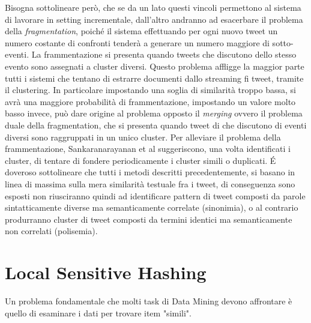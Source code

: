 \documentclass[a4paper,12pt]{report}
\begin{document}
Bisogna sottolineare però, che se da un lato questi vincoli permettono al sistema di lavorare in setting incrementale, dall'altro andranno ad esacerbare il problema della \emph{fragmentation}, poiché il sistema effettuando per ogni nuovo tweet un numero costante di confronti tenderà a generare un numero maggiore di sotto-eventi. La frammentazione si presenta quando tweets che discutono dello stesso evento sono assegnati a cluster diversi. Questo problema affligge la maggior parte tutti i sistemi che tentano di estrarre documenti dallo streaming fi tweet, tramite il clustering. In particolare impostando una soglia di similarità troppo bassa, si avrà una maggiore probabilità di frammentazione, impostando un valore molto basso invece, può dare origine al problema opposto il \emph{merging} ovvero il problema duale della fragmentation, che si presenta quando tweet di che discutono di eventi diversi sono raggruppati in un unico cluster. Per alleviare il problema della frammentazione, Sankaranarayanan et al \cite{Sankaranarayanan:2009:TNT:1653771.1653781} suggeriscono, una volta identificati i cluster, di tentare di fondere periodicamente i cluster simili o duplicati. \'E doveroso sottolineare che tutti i metodi descritti precedentemente, si basano in linea di massima   sulla mera similarità testuale fra i tweet,  di conseguenza sono esposti non riusciranno quindi ad identificare pattern di tweet composti da parole sintatticamente diverse ma  semanticamente correlate (sinonimia), o al contrario produrranno cluster di tweet composti da termini identici ma  semanticamente non correlati (polisemia).

\chapter{Local Sensitive Hashing}
Un problema fondamentale che molti task di Data Mining devono affrontare è quello di esaminare i dati per trovare item "simili".

 
\end{document}
